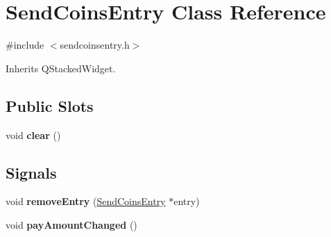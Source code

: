 \hypertarget{class_send_coins_entry}{}\section{Send\+Coins\+Entry Class Reference}
\label{class_send_coins_entry}


{\ttfamily \#include $<$sendcoinsentry.\+h$>$}



Inherits Q\+Stacked\+Widget.

\subsection*{Public Slots}
\begin{DoxyCompactItemize}
\item 
\mbox{\label{class_send_coins_entry_abff66fcd456c82144e7a2c410f5082ac}} 
void {\bfseries clear} ()
\end{DoxyCompactItemize}
\subsection*{Signals}
\begin{DoxyCompactItemize}
\item 
\mbox{\label{class_send_coins_entry_a9105a4f91781f96b91a1da65da9032bf}} 
void {\bfseries remove\+Entry} (\mbox{\hyperlink{class_send_coins_entry}{Send\+Coins\+Entry}} $\ast$entry)
\item 
\mbox{\label{class_send_coins_entry_a9f4fec53927c3ddd37ccea53f8d1e370}} 
void {\bfseries pay\+Amount\+Changed} ()
\end{DoxyCompactItemize}
